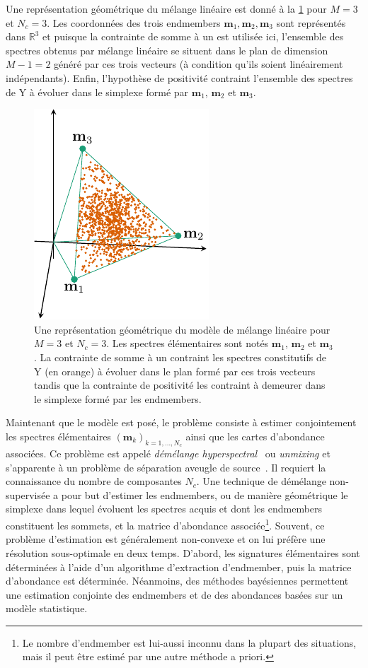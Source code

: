    Une représentation géométrique du mélange linéaire est donné à la \cref{fig-melange-lineaire} pour $M=3$ et $N_c=3$. Les coordonnées des trois endmembers $\mathbf{m}_1,\mathbf{m}_2,\mathbf{m}_3$ sont représentés dans $\mathbb{R}^3$ et puisque la contrainte de somme à un est utilisée ici, l'ensemble des spectres obtenus par mélange linéaire se situent dans le plan de dimension $M-1=2$ généré par ces trois vecteurs (à condition qu'ils soient linéairement indépendants). Enfin, l'hypothèse de positivité contraint l'ensemble des spectres de \gls{Y} à évoluer dans le simplexe formé par $\mathbf{m}_1$, $\mathbf{m}_2$ et $\mathbf{m}_3$.
    \begin{figure}
        \centering
        \includegraphics[]{img/chapitre1/figure17/melange_lineaire.pdf}
        \caption{Une représentation géométrique du modèle de mélange linéaire pour $M=3$ et $N_c=3$. Les spectres élémentaires sont notés $\mathbf{m}_1$, $\mathbf{m}_2$ et $\mathbf{m}_3$. La contrainte de somme à un contraint les spectres constitutifs de \gls{Y} (en orange) à évoluer dans le plan formé par ces trois vecteurs tandis que la contrainte de positivité les contraint à demeurer dans le simplexe formé par les endmembers.
            \protect\label{fig-melange-lineaire}}
    \end{figure}
    Maintenant que le modèle est posé, le problème consiste à estimer conjointement les spectres élémentaires $(\mathbf{m}_k)_{k=1,\dots,N_c}$ ainsi que les cartes d'abondance associées. Ce problème est appelé \emph{démélange hyperspectral}~\cite{bioucas2012hyperspectral, dobigeon2016linear} ou \emph{unmixing} et s'apparente à un problème de séparation aveugle de source~\cite{comon2010handbook}. Il requiert la connaissance du nombre de composantes $N_c$.
    Une technique de démélange non-supervisée a pour but d'estimer les endmembers, ou de manière géométrique le simplexe dans lequel évoluent les spectres acquis et dont les endmembers constituent les sommets, et la matrice d'abondance associée\footnote{Le nombre d'endmember est lui-aussi inconnu dans la plupart des situations, mais il peut être estimé par une autre méthode a priori.}. Souvent, ce problème d'estimation est généralement non-convexe et on lui préfère une résolution sous-optimale en deux temps. D'abord, les signatures élémentaires sont déterminées à l'aide d'un algorithme d'extraction d'endmember, puis la matrice d'abondance est déterminée. Néanmoins, des méthodes bayésiennes permettent une estimation conjointe des endmembers et de des abondances basées sur un modèle statistique.

